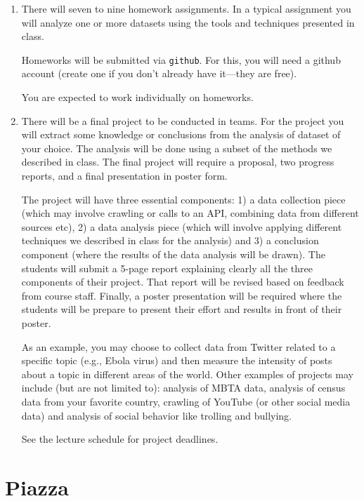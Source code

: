 \documentclass[11pt]{article}
\begin{document}
\begin{enumerate}
\item There will seven to nine homework assignments.  In a typical 
assignment you will 
analyze one or more datasets using the tools and techniques presented in
class.

Homeworks will be submitted via \texttt{github}.   For this, you will
need a github account (create one if you don't already have
  it---they are free). 



You are expected to work individually on homeworks.

\item There will be a final project to be conducted in teams.  For the project you
  will extract some
knowledge or conclusions from the analysis of dataset of your choice. The analysis
will be done using a subset of the methods we described in class.  The
final project will require a proposal, two progress reports, and a final
presentation in poster form.

The project will have three essential components: 1) a data collection
piece (which may involve crawling or calls to an API, combining data
from different sources etc), 2) a data analysis piece (which will
involve applying different techniques we described in class for the
analysis) and 3) a conclusion component (where the results of the data
analysis will be drawn).  The students will submit a 5-page report
explaining clearly all the three components of their project. That
report will be revised based on feedback from course staff. Finally, a
poster presentation will be required where the students will be prepare
to present their effort and results in front of their poster. 

As an example, you may choose to collect data from Twitter related to
a specific topic (e.g., Ebola virus) and then measure the intensity of
posts about a topic in different areas of the world.  Other examples
of projects may include (but are not limited to): analysis of MBTA
data, analysis of census data from your favorite country, crawling of
YouTube (or other social media data) and analysis of social behavior
like trolling and bullying.

See the lecture schedule for project deadlines.
\end{enumerate}

\section*{Piazza}
\end{document}
